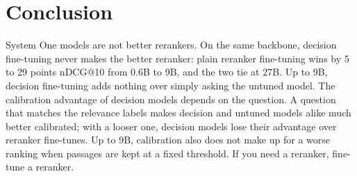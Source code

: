 \section{Conclusion}
\label{sec:conclusion}

System One models are not better rerankers. On the same backbone, decision fine-tuning never makes the better
reranker: plain reranker fine-tuning wins by 5 to 29 points nDCG@10 from 0.6B to 9B, and the two tie at 27B. Up to 9B,
decision fine-tuning adds nothing over simply asking the untuned model. The calibration advantage of decision models
depends on the question. A question that matches the relevance labels makes decision and untuned models alike much
better calibrated; with a looser one, decision models lose their advantage over reranker fine-tunes. Up to 9B,
calibration also does not make up for a worse ranking when passages are kept at a fixed threshold. If you need a
reranker, fine-tune a reranker.
